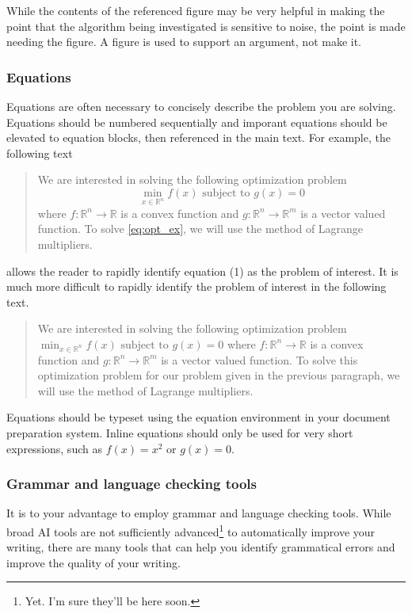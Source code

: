 \documentclass[]{article}
\begin{document}
While the contents of the referenced figure may be very helpful in making the point that the algorithm being investigated is sensitive to noise, the point is made needing the figure. A figure is used to support an argument, not make it.

\subsubsection{Equations}
Equations are often necessary to concisely describe the problem you are solving. Equations should be numbered sequentially and imporant equations should be elevated to equation blocks, then referenced in the main text. For example, the following text
\begin{quote}
    We are interested in solving the following optimization problem
    \begin{equation} \label{eq:opt_ex}
        \min_{x\in\mathbb{R}^n} f(x) \text{ subject to } g(x) = 0
    \end{equation}
    where $f:\mathbb{R}^n\to\mathbb{R}$ is a convex function and $g:\mathbb{R}^n\to\mathbb{R}^m$ is a vector valued function. To solve \eqref{eq:opt_ex}, we will use the method of Lagrange multipliers.
\end{quote}
allows the reader to rapidly identify equation (1) as the problem of interest. It is much more difficult to rapidly identify the problem of interest in the following text.
\begin{quote}
    We are interested in solving the following optimization problem
        $\min_{x\in\mathbb{R}^n} f(x) \text{ subject to } g(x) = 0$
    where $f:\mathbb{R}^n\to\mathbb{R}$ is a convex function and $g:\mathbb{R}^n\to\mathbb{R}^m$ is a vector valued function. To solve this optimization problem for our problem given in the previous paragraph, we will use the method of Lagrange multipliers.
\end{quote}
Equations should be typeset using the equation environment in your document preparation system. Inline equations should only be used for very short expressions, such as $f(x) = x^2$ or $g(x) = 0$.

\subsubsection{Grammar and language checking tools}

It is to your advantage to employ grammar and language checking tools. While broad AI tools are not sufficiently advanced\footnote{Yet. I'm sure they'll be here soon.} to automatically improve your writing, there are many tools that can help you identify grammatical errors and improve the quality of your writing.
\end{document}
